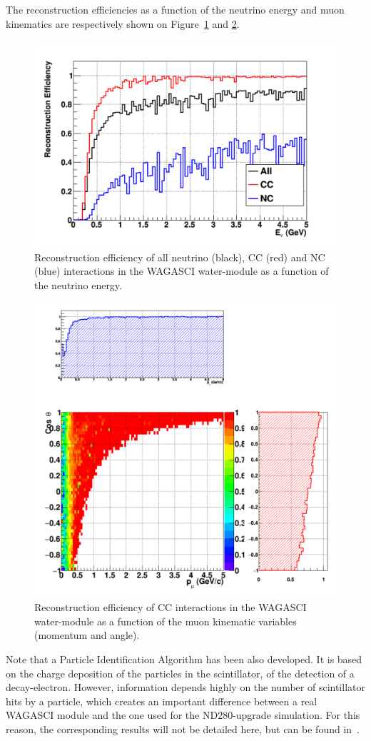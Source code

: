 The reconstruction efficiencies as a function of the neutrino energy and muon kinematics are respectively shown on Figure~\ref{fig:efficiency_enu} and \ref{fig:efficiency_muonkinematics}.
\begin{figure}
  \centering
\includegraphics[width=.7\textwidth]{fig/Efficiency_Enu.pdf}
  \caption{\label{fig:efficiency_enu} Reconstruction efficiency of all neutrino (black), CC (red) and NC (blue) interactions in the WAGASCI water-module as a function of the neutrino energy.}
\end{figure}
\begin{figure}
  \centering
\includegraphics[width=.7\textwidth]{fig/Efficiency_MuonKinematics.pdf}
  \caption{\label{fig:efficiency_muonkinematics} Reconstruction efficiency of CC interactions in the WAGASCI water-module as a function of the muon kinematic variables (momentum and angle).}
\end{figure}
\clearpage

Note that a Particle Identification Algorithm has been also developed. It is based on the charge deposition of the particles in the scintillator, of the detection of a decay-electron. 
However, 
information depends highly on the number of scintillator hits by a particle,
which creates an important difference between a real WAGASCI module and the one used for the ND280-upgrade simulation. For this reason, the corresponding results will not be detailed here, but can be found in~\cite{ND280Upgrade}.

